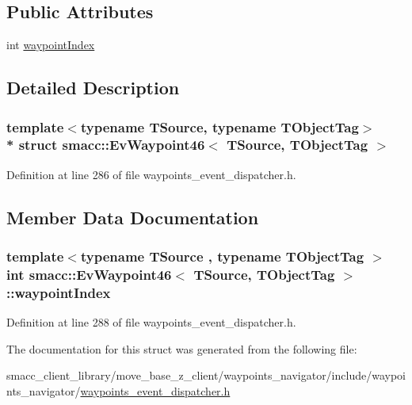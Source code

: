 \subsection*{Public Attributes}
\begin{DoxyCompactItemize}
\item 
int \hyperlink{structsmacc_1_1EvWaypoint46_ab6e0fefda40f678eb878d397fb3696c5}{waypoint\+Index}
\end{DoxyCompactItemize}


\subsection{Detailed Description}
\subsubsection*{template$<$typename T\+Source, typename T\+Object\+Tag$>$\\*
struct smacc\+::\+Ev\+Waypoint46$<$ T\+Source, T\+Object\+Tag $>$}



Definition at line 286 of file waypoints\+\_\+event\+\_\+dispatcher.\+h.



\subsection{Member Data Documentation}
\subsubsection[{\texorpdfstring{waypoint\+Index}{waypointIndex}}]{\setlength{\rightskip}{0pt plus 5cm}template$<$typename T\+Source , typename T\+Object\+Tag $>$ int {\bf smacc\+::\+Ev\+Waypoint46}$<$ T\+Source, T\+Object\+Tag $>$\+::waypoint\+Index}\hypertarget{structsmacc_1_1EvWaypoint46_ab6e0fefda40f678eb878d397fb3696c5}{}\label{structsmacc_1_1EvWaypoint46_ab6e0fefda40f678eb878d397fb3696c5}


Definition at line 288 of file waypoints\+\_\+event\+\_\+dispatcher.\+h.



The documentation for this struct was generated from the following file\+:\begin{DoxyCompactItemize}
\item 
smacc\+\_\+client\+\_\+library/move\+\_\+base\+\_\+z\+\_\+client/waypoints\+\_\+navigator/include/waypoints\+\_\+navigator/\hyperlink{waypoints__event__dispatcher_8h}{waypoints\+\_\+event\+\_\+dispatcher.\+h}\end{DoxyCompactItemize}
